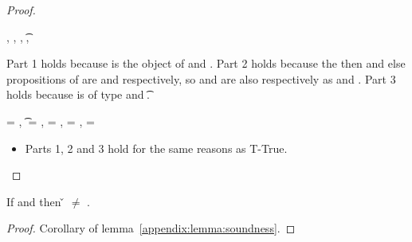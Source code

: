 \begin{lemma}
\begin{proof}
\begin{case}[T-Subsume]
  \judgement {\propenv{}} {\e{}} {\tp{}}
             {\filterset {\thenprop {\propp{}}}
                         {\elseprop {\propp{}}}}
             {\objectp{}},
\inpropenv {\propenv{}, {\thenprop {\propp{}}}} {\thenprop {\prop{}}},
\inpropenv {\propenv{}, {\elseprop {\propp{}}}} {\elseprop {\prop{}}},
\inpropenv {} {\issubtype {\tp{}} {\t{}}},
\inpropenv {} {\issubtype {\objectp{}} {\object{}}}

Part 1 holds because \objectp{} is the object of \e{}
and \inpropenv {} {\issubtype {\objectp{}} {\object{}}}.
Part 2 holds because 
the then and else propositions of \e{} are
{\thenprop {\propp{}}} and 
{\elseprop {\propp{}}} respectively, so
{\thenprop {\prop{}}} and
{\elseprop {\prop{}}} are also respectively as 
\inpropenv {\propenv{}, {\thenprop {\propp{}}}} {\thenprop {\prop{}}} and
\inpropenv {\propenv{}, {\elseprop {\propp{}}}} {\elseprop {\prop{}}}.
Part 3 holds because \e{} is of type \tp{} and 
\inpropenv {} {\issubtype {\tp{}} {\t{}}}.

\end{case}

\begin{case}[T-Const]\e{} = {\const{}},
  \t{} = {\constanttype{\const{}}},
{\thenprop{\prop{}}} = {\topprop{}},
{\elseprop{\prop{}}} = {\botprop{}},
{\object{}} = {\emptyobject{}}

  \begin{itemize}
    \item[] 
      \begin{subcase}[B-Val]
        Parts 1, 2 and 3 hold for the same reasons as T-True. 
      \end{subcase}
  \end{itemize}
\end{case}

\end{proof}

\end{lemma}

{}

{}

\begin{theorem} \label{appendix:theorem:nullpointer}
If \judgement{\propenv{}}{\v{}}{\t{}}{\filterset{\thenprop{\prop{}}}{\elseprop{\prop{}}}}{\object{}}
and \notsubtypein{}{\Nil{}}{\t{}}
then {\v{}} $\not=$ \nil{}.
\begin{proof}
  Corollary of lemma~\ref{appendix:lemma:soundness}.
\end{proof}

\end{theorem}

